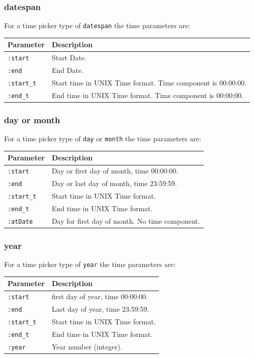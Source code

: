 \documentclass[a4paper,10pt]{book}
\begin{document}
\subsubsection{datespan}
For a time picker type of \verb|datespan| the time parameters are:

\begin{tabular}{p{2.5cm} l}
\hline
\textbf{Parameter} & \textbf{Description} \\
\hline
\verb|:start| & Start Date.\\
\verb|:end| & End Date.\\
\verb|:start_t| & Start time in UNIX Time format. Time component is 00:00:00.\\
\verb|:end_t| & End time in UNIX Time format. Time component is 00:00:00.\\
\hline
\end{tabular}

\subsubsection{day or month}
For a time picker type of \verb|day| or \verb|month| the time parameters are:

\begin{tabular}{p{2.5cm} l}
\hline
\textbf{Parameter} & \textbf{Description} \\
\hline
\verb|:start| & Day or first day of month, time 00:00:00.\\
\verb|:end| & Day or last day of month, time 23:59:59.\\
\verb|:start_t| & Start time in UNIX Time format.\\
\verb|:end_t| & End time in UNIX Time format.\\
\verb|:atDate| & Day for first day of month. No time component.\\
\hline
\end{tabular}

\subsubsection{year}
For a time picker type of \verb|year| the time parameters are:

\begin{tabular}{p{2.5cm} l}
\hline
\textbf{Parameter} & \textbf{Description} \\
\hline
\verb|:start| & first day of year, time 00:00:00.\\
\verb|:end| & Last day of year, time 23:59:59.\\
\verb|:start_t| & Start time in UNIX Time format.\\
\verb|:end_t| & End time in UNIX Time format.\\
\verb|:year| & Year number (integer).\\
\hline
\end{tabular}
\end{document}
